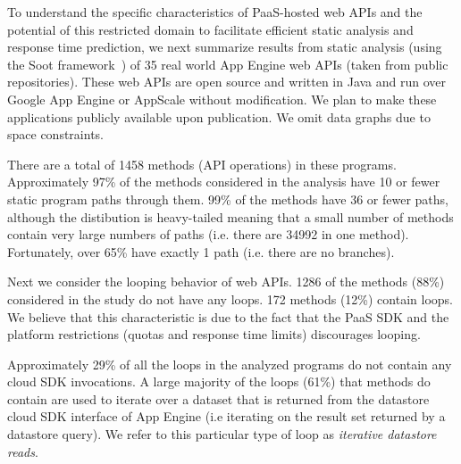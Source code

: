 To understand the specific characteristics of PaaS-hosted web APIs and the potential
of this restricted domain to facilitate efficient static analysis and response time 
prediction,  we next summarize results from static analysis (using the Soot
framework~\cite{Vallee-Rai:2010:SJB:1925805.1925818}) of 
35 real world App Engine web APIs (taken from public 
repositories). These web APIs are open 
source and written in Java and run over Google App Engine or AppScale without modification.
We plan to make these applications publicly available upon publication.  We omit data graphs due to space constraints.


There are a total of 1458 methods (API operations) in these programs.
Approximately 97\% of the methods considered in the analysis have 10 or fewer 
static program paths through them.  99\% of 
the methods have 36 or fewer paths, although the distibution is heavy-tailed meaning
that a small number of methods 
contain very large numbers of paths (i.e. there are 34992 in one method).
Fortunately, over 65\% have exactly 1 path (i.e. there are no branches).

Next we consider the looping behavior of web APIs.  1286 of the methods (88\%)
considered in the study
do not have any loops. 172 methods (12\%) contain loops. 
We believe that this characteristic is due to the fact that 
the PaaS SDK and the platform restrictions (quotas and response time limits) 
discourages looping.

Approximately 29\% of all the loops in 
the analyzed programs do not contain any cloud SDK invocations. 
A large majority of the loops (61\%) that methods do contain are
used to iterate over a dataset that is returned from the datastore cloud SDK interface 
of App Engine (i.e iterating on the result set 
returned by a datastore query). We refer to this particular type of 
loop as \textit{iterative datastore reads}. 

